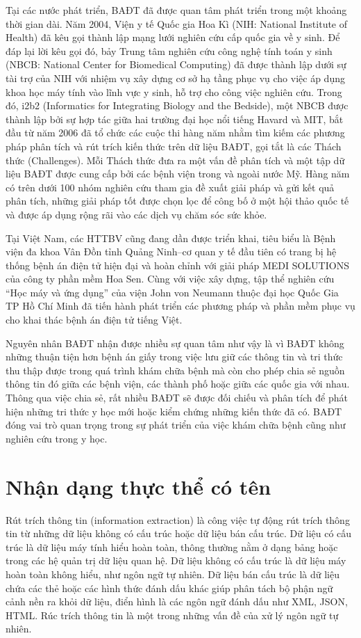 Tại các nước phát triển, BAĐT đã được quan tâm phát triển trong một khoảng thời gian dài. Năm 2004, Viện y tế Quốc gia Hoa Kì (NIH: National Institute of Health) đã kêu gọi thành lập mạng lưới nghiên cứu cấp quốc gia về y sinh. Để đáp lại lời kêu gọi đó, bảy Trung tâm nghiên cứu công nghệ tính toán y sinh (NBCB: National Center for Biomedical Computing) đã được thành lập dưới sự tài trợ của NIH với nhiệm vụ xây dựng cơ sở hạ tầng phục vụ cho việc áp dụng khoa học máy tính vào lĩnh vực y sinh, hỗ trợ cho công việc nghiên cứu. Trong đó, i2b2 (Informatics for Integrating Biology and the Bedside), một NBCB được thành lập bởi sự hợp tác giữa hai trường đại học nổi tiếng Havard và MIT, bắt đầu từ năm 2006 đã tổ chức các cuộc thi hàng năm nhằm tìm kiếm các phương pháp phân tích và rút trích kiến thức trên dữ liệu BAĐT, gọi tắt là các Thách thức (Challenges). Mỗi Thách thức đưa ra một vấn đề phân tích và một tập dữ liệu BAĐT được cung cấp bởi các bệnh viện trong và ngoài nước Mỹ. Hàng năm có trên dưới 100 nhóm nghiên cứu tham gia đề xuất giải pháp và gửi kết quả phân tích, những giải pháp tốt được chọn lọc để công bố ở một hội thảo quốc tế và được áp dụng rộng rãi vào các dịch vụ chăm sóc sức khỏe.

Tại Việt Nam, các HTTBV cũng đang dần được triển khai, tiêu biểu là Bệnh viện đa khoa Vân Đồn tỉnh Quảng Ninh--cơ quan y tế đầu tiên có trang bị hệ thống bệnh án điện tử hiện đại và hoàn chỉnh với giải pháp MEDI SOLUTIONS của công ty phần mềm Hoa Sen. Cùng với việc xây dựng, tập thể nghiên cứu ``Học máy và ứng dụng'' của viện John von Neumann thuộc đại học Quốc Gia TP Hồ Chí Minh đã tiến hành phát triển các phương pháp và phần mềm phục vụ cho khai thác bệnh án điện tử tiếng Việt.

Nguyên nhân BAĐT nhận được nhiều sự quan tâm như vậy là vì BAĐT không những thuận tiện hơn bệnh án giấy trong việc lưu giữ các thông tin và tri thức thu thập được trong quá trình khám chữa bệnh mà còn cho phép chia sẻ nguồn thông tin đó giữa các bệnh viện, các thành phố hoặc giữa các quốc gia với nhau. Thông qua việc chia sẻ, rất nhiều BAĐT sẽ được đối chiếu và phân tích để phát hiện những tri thức y học mới hoặc kiểm chứng những kiến thức đã có. BAĐT đóng vai trò quan trọng trong sự phát triển của việc khám chữa bệnh cũng như nghiên cứu trong y học.

\section{Nhận dạng thực thể có tên}
Rút trích thông tin (information extraction) là công việc tự động rút trích thông tin từ những dữ liệu không có cấu trúc hoặc dữ liệu bán cấu trúc. Dữ liệu có cấu trúc là dữ liệu máy tính hiểu hoàn toàn, thông thường nằm ở dạng bảng hoặc trong các hệ quản trị dữ liệu quan hệ. Dữ liệu không có cấu trúc là dữ liệu máy hoàn toàn không hiểu, như ngôn ngữ tự nhiên. Dữ liệu bán cấu trúc là dữ liệu chứa các thẻ hoặc các hình thức đánh dấu khác giúp phân tách bộ phận ngữ cảnh nền ra khỏi dữ liệu, điển hình là các ngôn ngữ đánh dấu như XML, JSON, HTML. Rúc trích thông tin là một trong những vấn đề của xử lý ngôn ngữ tự nhiên.

